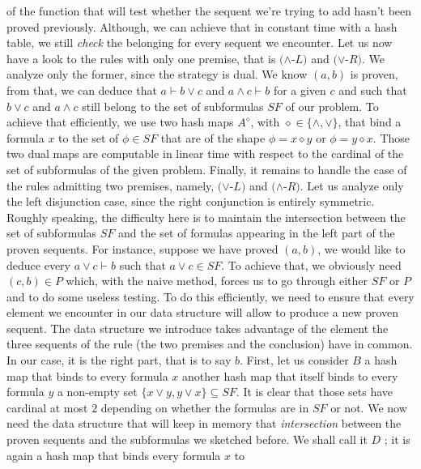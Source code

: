 \documentclass[a4paper, 11pt]{article}
\begin{document}
    of the function that will test whether the sequent we're trying to add hasn't been proved previously.
    Although, we can achieve that in constant time with a hash table, we still \textit{check} the 
    belonging for every sequent we encounter. %
    Let us now have a look to the rules with only
    one premise, that is $(\wedge$-$L)$ and $(\vee$-$R)$. We analyze only the former, since the strategy
    is dual. We know $(a,b)$ is proven, from that, we can deduce that $a\vdash b\vee c$ and 
    $a\wedge c\vdash b$ for a given $c$ and such that $b\vee c$ and $a\wedge c$ still belong to the set 
    of subformulas $SF$ of our problem. To achieve that efficiently, we use two hash maps $A^\diamond$,
    with $\diamond\in\{\wedge,\vee\}$, that bind a formula $x$ to the set of $\phi\in SF$ that are of
    the shape $\phi=x\diamond y$ or $\phi=y\diamond x$. Those two dual maps are computable in linear time
    with respect to the cardinal of the set of subformulas of the given problem. Finally, it remains to
    handle the case of the rules admitting two premises, namely, $(\vee$-$L)$ and $(\wedge$-$R)$. Let us
    analyze only the left disjunction case, since the right conjunction is entirely symmetric. Roughly
    speaking, the difficulty here is to maintain the intersection between the set of subformulas $SF$
    and the set of formulas appearing in the left part of the proven sequents. For instance, suppose
    we have proved $(a,b)$, we would like to deduce every $a\vee c\vdash b$ such that $a\vee c\in SF$.
    To achieve that, we obviously need $(c,b)\in P$ which, with the naive method, forces us to go through
    either $SF$ or $P$ and to do some useless testing. To do this efficiently, we need to ensure that
    every element we encounter in our data structure will allow to produce a new proven sequent. The
    data structure we introduce takes advantage of the element the three sequents of the rule
    (the two premises and the conclusion) have in common. In our case, it is the right part, that is to 
    say $b$. First, let us consider 
    $B$ a hash map that binds to every formula $x$ another hash map that itself binds to every 
    formula $y$ a non-empty set $\{x\vee y,y\vee x\}\subseteq SF$. It is clear that those sets have 
    cardinal at 
    most $2$ depending on whether the formulas are in $SF$ or not. We now need the data structure that
    will keep in memory that \textit{intersection} between the proven sequents and the subformulas we
    sketched before. We shall call it $D$ ; it is again a hash map that binds every formula $x$ to
\end{document}
